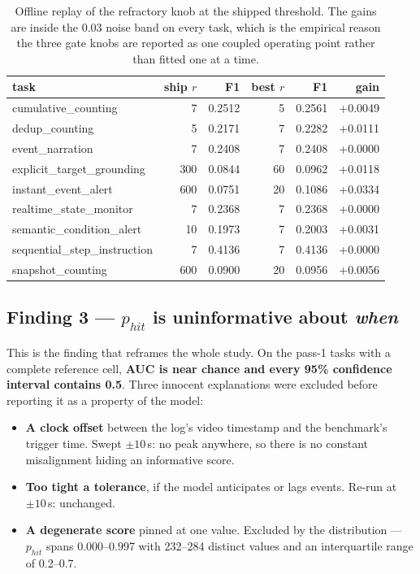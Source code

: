 \documentclass[11pt,a4paper]{article}
\begin{document}
\begin{table}[t]\centering\small\caption{Offline replay of the refractory knob at the shipped threshold. The gains are inside the 0.03 noise band on every task, which is the empirical reason the three gate knobs are reported as one coupled operating point rather than fitted one at a time.}\label{tab:refractory}
\begin{tabular}{lrrrrr}\toprule
task & ship $r$ & F1 & best $r$ & F1 & gain \\\midrule
cumulative\_counting & 7 & 0.2512 & 5 & 0.2561 & +0.0049 \\
dedup\_counting & 5 & 0.2171 & 7 & 0.2282 & +0.0111 \\
event\_narration & 7 & 0.2408 & 7 & 0.2408 & +0.0000 \\
explicit\_target\_grounding & 300 & 0.0844 & 60 & 0.0962 & +0.0118 \\
instant\_event\_alert & 600 & 0.0751 & 20 & 0.1086 & +0.0334 \\
realtime\_state\_monitor & 7 & 0.2368 & 7 & 0.2368 & +0.0000 \\
semantic\_condition\_alert & 10 & 0.1973 & 7 & 0.2003 & +0.0031 \\
sequential\_step\_instruction & 7 & 0.4136 & 7 & 0.4136 & +0.0000 \\
snapshot\_counting & 600 & 0.0900 & 20 & 0.0956 & +0.0056 \\
\bottomrule\end{tabular}\end{table}


\subsection{Finding 3 --- $p_\mathit{hit}$ is uninformative about \emph{when}}

This is the finding that reframes the whole study. On the pass-1 tasks
with a complete reference cell, \textbf{AUC is near chance and every 95\%
confidence interval contains 0.5}. Three innocent explanations were excluded
before reporting it as a property of the model:

\begin{itemize}
\item \textbf{A clock offset} between the log's video timestamp and the
benchmark's trigger time. Swept $\pm10$\,s: no peak anywhere, so there is no
constant misalignment hiding an informative score.
\item \textbf{Too tight a tolerance}, if the model anticipates or lags events.
Re-run at $\pm10$\,s: unchanged.
\item \textbf{A degenerate score} pinned at one value. Excluded by the
distribution --- $p_\mathit{hit}$ spans 0.000--0.997 with 232--284 distinct
values and an interquartile range of 0.2--0.7.
\end{itemize}
\end{document}
